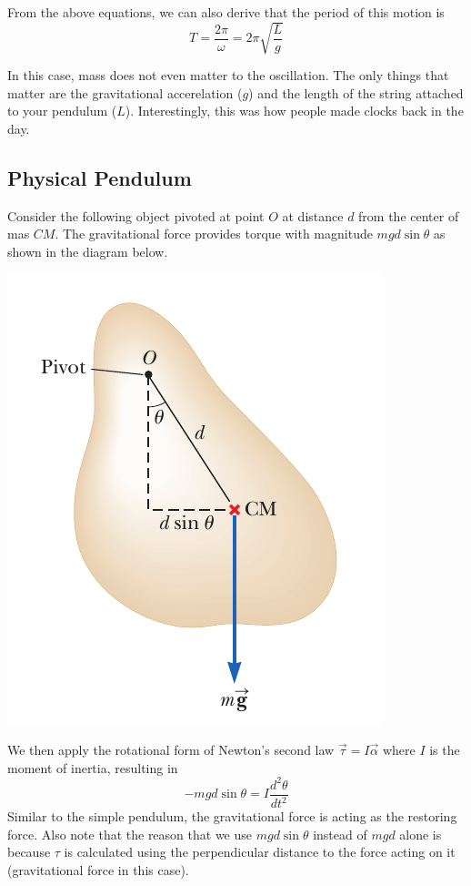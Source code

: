 From the above equations, we can also derive that the period of this motion is
\begin{equation}
    T = \frac{2\pi}{\omega} = 2\pi\sqrt{\frac{L}{g}}
\end{equation}

In this case, mass does not even matter to the oscillation. The only things that matter are the 
gravitational accerelation ($g$) and the length of the string attached to your pendulum ($L$).
Interestingly, this was how people made clocks back in the day.

\subsection{Physical Pendulum}

Consider the following object pivoted at point $O$ at distance $d$ from the center of mas $CM$.
The gravitational force provides torque with magnitude $mgd\sin\theta$ as shown in the diagram below.

\begin{center}
\includegraphics[scale=0.5]{images/oaw/rotation01.png}
\end{center}

We then apply the rotational form of Newton's second law $\vec{\tau} = I\vec{\alpha}$ where $I$ is
the moment of inertia, resulting in 
\[ -mgd \sin\theta = I\frac{d^2\theta}{dt^2} \]
Similar to the simple pendulum, the gravitational force is acting as the restoring force.
Also note that the reason that we use $mgd\sin\theta$ instead of $mgd$ alone is because $\tau$ is
calculated using the perpendicular distance to the force acting on it (gravitational force in this
case).

